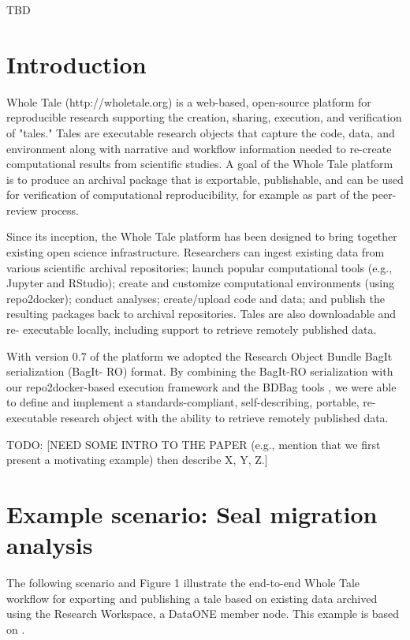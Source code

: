 \documentclass[conference]{IEEEtran}
\begin{document}
\begin{IEEEkeywords}
TBD
\end{IEEEkeywords}

\section{Introduction}


\cite{chard2016, chard2019, mecum2018, gentleman2007, brinckman2019}

Whole Tale (http://wholetale.org) is a web-based, open-source platform for reproducible research 
supporting the creation, sharing, execution, and verification of "tales." Tales are executable 
research objects that capture the code, data, and environment along with narrative and workflow 
information needed to re-create computational results from scientific studies. A goal of the Whole 
Tale platform is to produce an archival package that is exportable, publishable, and can be used 
for verification of computational reproducibility, for example as part of the peer-review process.

Since its inception, the Whole Tale platform has been designed to bring together existing open 
science infrastructure.  Researchers can ingest existing data from various scientific archival 
repositories; launch popular computational tools (e.g., Jupyter and RStudio); create and customize 
computational environments (using repo2docker); conduct analyses; create/upload code and data; and 
publish the resulting packages back to archival repositories. Tales are also downloadable and re-
executable locally, including support to retrieve remotely published data.  

With version 0.7 of the platform we adopted the Research Object Bundle BagIt serialization (BagIt-
RO) format. By combining the BagIt-RO serialization with our repo2docker-based execution framework 
and the BDBag tools \cite{chard2016}, we were able to  define and implement a standards-compliant, self-describing, portable, re-executable research object with the ability to retrieve remotely published data.

TODO:
[NEED SOME INTRO TO THE PAPER (e.g., mention that we first present a motivating example) then 
describe X, Y, Z.]


\section{Example scenario: Seal migration analysis}
The following scenario and Figure 1 illustrate the end-to-end Whole Tale workflow for exporting 
and publishing a tale based on existing data archived using the Research Workspace, a DataONE 
member node. This example is based on \cite{london2018, cameron2018}.
\end{document}
